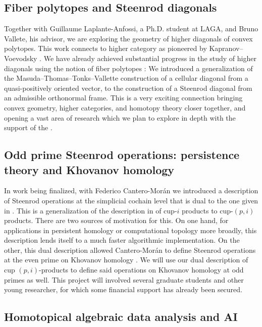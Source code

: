 \subsection{Fiber polytopes and Steenrod diagonals}

Together with Guillaume Laplante-Anfossi, a Ph.D. student at LAGA, and Bruno Vallete, his advisor, we are exploring the geometry of higher diagonals of convex polytopes.
This work connects to higher category as pioneered by Kapranov--Voevodsky \cite{kapranov1991polycategories}.
We have already achieved substantial progress in the study of higher diagonals using the notion of fiber polytopes \cite{billera1992fiber.polytopes}:
We introduced a generalization of the Masuda--Thomas--Tonks--Vallette construction of a cellular diagonal from a quasi-positively oriented vector, to the construction of a Steenrod diagonal from an admissible orthonormal frame.
This is a very exciting connection bringing convex geometry, higher categories, and homotopy theory closer together, and opening a vast area of research which we plan to explore in depth with the support of the \grantName.

\subsection{Odd prime Steenrod operations: persistence theory and Khovanov homology}

In work being finalized, with Federico Cantero-Mor\'{a}n we introduced a description of Steenrod operations at the simplicial cochain level that is dual to the one given in \cite{medina2021maysteenrod}.
This is a generalization of the description in \cite{medina2021newformulas} of cup-$i$ products to cup-$(p,i)$ products.
There are two sources of motivation for this.
On one hand, for applications in persistent homology or computational topology more broadly, this description lends itself to a much faster algorithmic implementation.
On the other, this dual description allowed Cantero-Mor\'an to define Steenrod operations at the even prime on Khovanov homology \cite{cantero-moran2020khovanov}.
We will use our dual description of cup $(p,i)$-products to define said operations on Khovanov homology at odd primes as well.
This project will involved several graduate students and other young researcher, for which some financial support has already been secured.

\subsection{Homotopical algebraic data analysis and AI}

